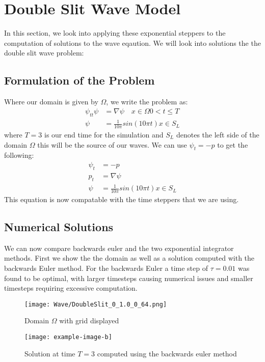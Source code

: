 \section{Double Slit Wave Model}

In this section, we look into applying these exponential steppers to the computation of solutions to the wave eqaution.
We will look into solutions the the double slit wave problem:

\subsection{Formulation of the Problem}
Where our domain is given by $\Omega$, we write the problem as:
\begin{align*}
    \psi_{tt}\psi &= \nabla \psi \quad x \in \Omega 0<t\leq T\\
    \psi &= \frac{1}{10\pi} sin(10\pi t) x \in S_L
\end{align*}
where $T=3$ is our end time for the simulation and $S_L$ denotes the left side of the domain $\Omega$ this will be the source of our waves.
We can use $\psi_t = -p$ to get the following:
\begin{align*}
    \psi_t &= -p\\
    p_t &= \nabla \psi\\
    \psi &= \frac{1}{10\pi} sin(10\pi t) x \in S_L
\end{align*}
This equation is now compatable with the time steppers that we are using.

\subsection{Numerical Solutions}
We can now compare backwards euler and the two exponential integrator methods.
First we show the the domain as well as a solution computed with the backwards Euler method.
For the backwards Euler a time step of $\tau = 0.01$ was found to be optimal, with larger timesteps causing numerical issues and smaller timesteps requiring excessive computation.

\begin{figure}[H]
    \centering
    \begin{minipage}{0.49\textwidth}
        \texttt{[image: Wave/DoubleSlit\_0\_1.0\_0\_64.png]} %
        \caption{Domain $\Omega$ with grid displayed}
        \label{fig:second order 16}
    \end{minipage}\hfill
    \centering
    \begin{minipage}{0.49\textwidth}
        \texttt{[image: example-image-b]} %
        \caption{Solution at time $T=3$ computed using the backwards euler method}
        \label{fig:second order 32}
    \end{minipage}\hfill
\end{figure}


